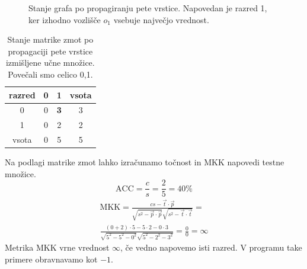 \documentclass[a4paper,12pt,openright]{book}
\begin{document}
\begin{description}
{\begin{figure}[H]
                \caption{Stanje grafa po propagiranju pete vrstice. Napovedan je razred 1, ker izhodno vozlišče $o_1$ vsebuje največjo vrednost.}
                \label{fig:izracun_kakovosti_primer_5_vrstica}
            \end{figure}
            \begin{table}[H]
                \centering
                \begin{tabular}{||c c c c||}
                    \hline
                    razred & 0 & 1          & vsota \\ [0.5ex]
                    \hline
                    0      & 0 & \textbf{3} & 3     \\
                    \hline
                    1      & 0 & 2          & 2     \\
                    \hline
                    vsota  & 0 & 5          & 5     \\
                    \hline
                \end{tabular}
                \caption{Stanje matrike zmot po propagaciji pete vrstice izmišljene učne množice. Povečali smo celico 0,1.}
                \label{tab:izracun_kakovosti_cm_5}
            \end{table}}
    \end{description}

    Na podlagi matrike zmot lahko izračunamo točnost in MKK napovedi testne množice.
    \begin{equation}
        \text{ACC}=\frac{c}{s}=\frac{2}{5}=40\%\label{eq:tocnost_primer}
    \end{equation}
    \begin{equation}
        \begin{split}
            \text{MKK}={\frac {cs-{\vec {t}}\cdot {\vec {p}}}{{\sqrt {s^{2}-{\vec {p}}\cdot {\vec {p}}}}{\sqrt {s^{2}-{\vec {t}}\cdot {\vec {t}}}}}}= \\
            \frac{(0+2)\cdot 5 - 5\cdot 2 - 0 \cdot 3}{\sqrt{5^2-5^2-0^2}\sqrt{5^2-2^2-3^2}}=\frac{0}{0} = \infty
        \end{split}\label{eq:mcc_primer}
    \end{equation}
    Metrika MKK vrne vrednost $\infty$, če vedno napovemo isti razred.
    V programu take primere obravnavamo kot $-1$.
\end{document}
